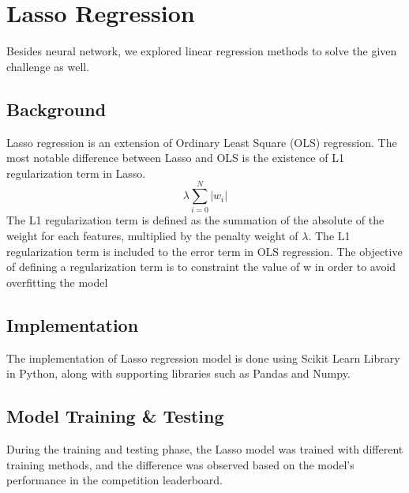 \section{Lasso Regression} \label{sc:lasso}
Besides neural network, we explored linear regression methods to solve the given challenge as well.

\subsection{Background}
Lasso regression is an extension of Ordinary Least Square (OLS) regression. The most notable difference between Lasso and OLS is the existence of L1 regularization term in Lasso.
\begin{equation}
\label{eq:l1_regularization}
\lambda \sum_{i=0}^{N} |w_i|
\end{equation}
The L1 regularization term is defined as the summation of the absolute of the weight for each features, multiplied by the penalty weight of $\lambda$. The L1 regularization term is included to the error term in OLS regression. The objective of defining a regularization term is to constraint the value of w in order to avoid overfitting the model

\subsection{Implementation}
The implementation of Lasso regression model is done using Scikit Learn Library in Python, along with supporting libraries such as Pandas and Numpy.

\subsection{Model Training \& Testing}
During the training and testing phase, the Lasso model was trained with different training methods, and the difference was observed based on the model's performance in the competition leaderboard.

